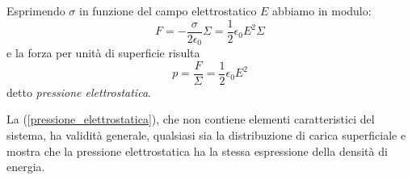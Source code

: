 \documentclass[class=book, crop=false, oneside, 12pt]{standalone}
\begin{document}
Esprimendo \(\sigma\) in funzione del campo elettrostatico \(E\) abbiamo in modulo:
\begin{equation*}
    F =  - \frac{\sigma}{2 \epsilon_0} \Sigma = \frac{1}{2} \epsilon_0 E^2 \Sigma
\end{equation*}
e la forza per unità di superficie risulta 
\begin{equation}
    p = \frac{F}{\Sigma} = \frac{1}{2} \epsilon_0 E^2
\end{equation} \label{pressione_elettrostatica}
detto \emph{pressione elettrostatica}.

La (\ref{pressione_elettrostatica}), che non contiene elementi caratteristici del sistema, ha validità generale, qualsiasi sia la distribuzione di carica superficiale e mostra che la pressione elettrostatica ha la stessa espressione della densità di energia. 
\end{document}
